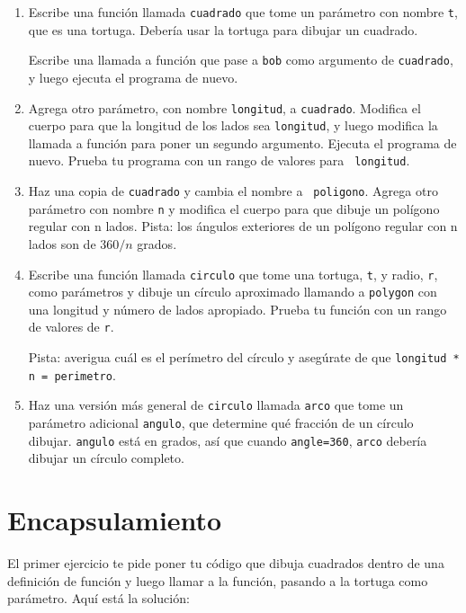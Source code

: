 \documentclass[10pt]{book}
\begin{document}
\begin{enumerate}

\item Escribe una función llamada {\tt cuadrado} que tome un parámetro
con nombre {\tt t}, que es una tortuga.  Debería usar la tortuga para dibujar
un cuadrado.

Escribe una llamada a función que pase a {\tt bob} como argumento de 
{\tt cuadrado}, y luego ejecuta el programa de nuevo.

\item Agrega otro parámetro, con nombre {\tt longitud}, a {\tt cuadrado}.
Modifica el cuerpo para que la longitud de los lados sea {\tt longitud}, y luego
modifica la llamada a función para poner un segundo argumento.  Ejecuta el
programa de nuevo.  Prueba tu programa con un rango de valores para {\tt
longitud}.

\item Haz una copia de {\tt cuadrado} y cambia el nombre a {\tt
  poligono}.  Agrega otro parámetro con nombre {\tt n} y modifica el cuerpo
  para que dibuje un polígono regular con n lados.  Pista: los ángulos exteriores
  de un polígono regular con n lados son de $360/n$ grados.   

\item Escribe una función llamada {\tt circulo} que tome una tortuga,
{\tt t}, y radio, {\tt r}, como parámetros y dibuje un círculo
aproximado llamando a {\tt polygon} con una longitud y
número de lados apropiado.  Prueba tu función con un rango de valores
de {\tt r}.   

Pista: averigua cuál es el perímetro del círculo y asegúrate de que
{\tt longitud * n = perimetro}.

\item Haz una versión más general de {\tt circulo} llamada {\tt arco}
que tome un parámetro adicional {\tt angulo}, que determine
qué fracción de un círculo dibujar.  {\tt angulo} está en
grados, así que cuando {\tt angle=360}, {\tt arco} debería dibujar un círculo
completo.

\end{enumerate}


\section{Encapsulamiento}

El primer ejercicio te pide poner tu código que dibuja cuadrados
dentro de una definición de función y luego llamar a la función, pasando
a la tortuga como parámetro.  Aquí está la solución:
\end{document}
